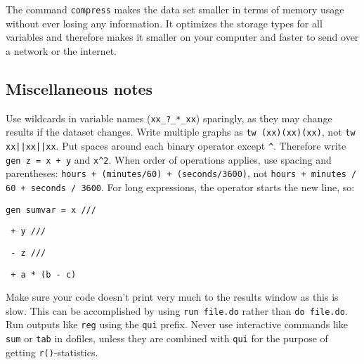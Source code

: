 The command \texttt{compress} makes the data set smaller in terms of memory usage
without ever losing any information.
It optimizes the storage types for all variables
and therefore makes it smaller on your computer
and faster to send over a network or the internet.


\subsection{Miscellaneous notes}

Use wildcards in variable names (\texttt{xx\_?\_*\_xx}) sparingly,
as they may change results if the dataset changes.
Write multiple graphs as \texttt{tw (xx)(xx)(xx)}, not \texttt{tw xx||xx||xx}.
Put spaces around each binary operator except \texttt{\^}.
Therefore write \texttt{gen z = x + y} and \texttt{x\^}\texttt{2}.
When order of operations applies, use spacing and parentheses:
\texttt{hours + (minutes/60) + (seconds/3600)}, not \texttt{hours + minutes / 60 + seconds / 3600}.
For long expressions, the operator starts the new line, so:

\texttt{gen sumvar =   x ///}

\texttt{             + y ///}

\texttt{             - z ///}

\texttt{             + a * (b - c)}

\noindent Make sure your code doesn't print very much to the results window as this is slow.
This can be accomplished by using \texttt{run file.do} rather than \texttt{do file.do}.
Run outputs like \texttt{reg} using the \texttt{qui} prefix.
Never use interactive commands like \texttt{sum} or \texttt{tab} in dofiles,
unless they are combined with \texttt{qui} for the purpose of getting \texttt{r()}-statistics.

\mainmatter
